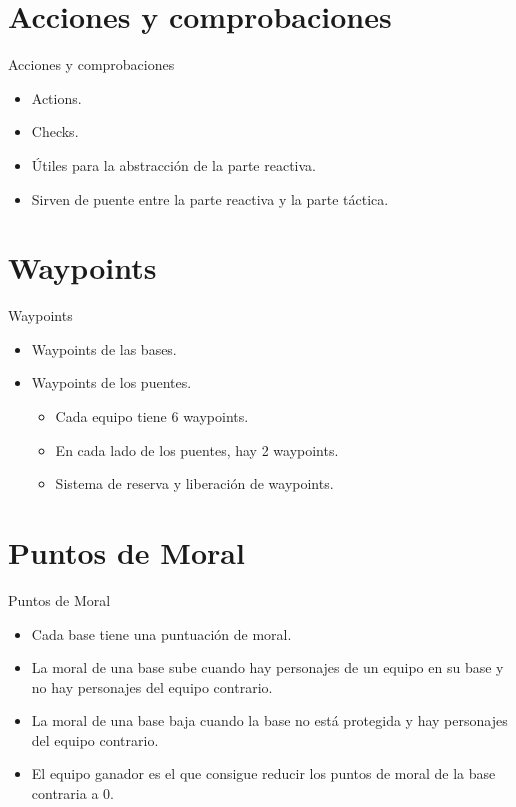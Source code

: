 \documentclass[10pt]{beamer}
\begin{document}
\section{Acciones y comprobaciones}
\begin{frame}{Acciones y comprobaciones}
\begin{itemize}[<+- | alert@+>]
	\item Actions.
	\item Checks.
	\item Útiles para la abstracción de la parte reactiva.
	\item Sirven de puente entre la parte reactiva y la parte táctica.
\end{itemize}
\end{frame}


\section{Waypoints}
\begin{frame}{Waypoints}
\begin{itemize}[<+- | alert@+>]
	\item Waypoints de las bases.
	\item Waypoints de los puentes.
	\begin{itemize}[<+- | alert@+>]
		\item Cada equipo tiene 6 waypoints.
		\item En cada lado de los puentes, hay 2 waypoints.
		\item Sistema de reserva y liberación de waypoints.
	\end{itemize}
\end{itemize}
\end{frame}


\section{Puntos de Moral}
\begin{frame}{Puntos de Moral}
\begin{itemize}[<+- | alert@+>]
	\item Cada base tiene una puntuación de moral.
	\item La moral de una base sube cuando hay personajes de un equipo en su base y no hay personajes del equipo contrario.
	\item La moral de una base baja cuando la base no está protegida y hay personajes del equipo contrario.
	\item El equipo ganador es el que consigue reducir los puntos de moral de la base contraria a 0.
\end{itemize}
\end{frame}
\end{document}
